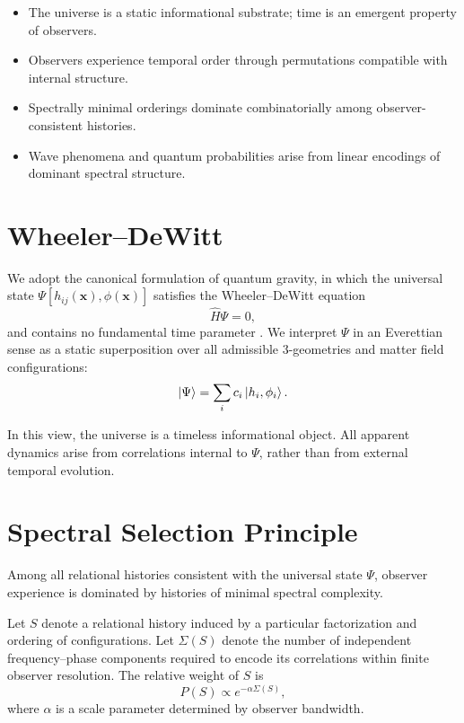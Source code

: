 \documentclass[11pt]{article}
\begin{document}
\begin{itemize}
\item The universe is a static informational substrate; time is an emergent property of observers.
\item Observers experience temporal order through permutations compatible with internal structure.
\item Spectrally minimal orderings dominate combinatorially among observer-consistent histories.
\item Wave phenomena and quantum probabilities arise from linear encodings of dominant spectral structure.
\end{itemize}

\section{Wheeler--DeWitt}

We adopt the canonical formulation of quantum gravity, in which the universal state
\(
\Psi[h_{ij}(\mathbf{x}),\phi(\mathbf{x})]
\)
satisfies the Wheeler--DeWitt equation
\begin{equation}
\hat{H}\Psi = 0,
\end{equation}
and contains no fundamental time parameter \cite{dewitt1967}.
We interpret \( \Psi \) in an Everettian sense as a static superposition over all admissible
3-geometries and matter field configurations:
\begin{equation}
\ket{\Psi} = \sum_i c_i \ket{h_i,\phi_i}.
\end{equation}

In this view, the universe is a timeless informational object.
All apparent dynamics arise from correlations internal to \( \Psi \),
rather than from external temporal evolution.

\section{Spectral Selection Principle}

Among all relational histories consistent with the universal state \( \Psi \),
observer experience is dominated by histories of minimal spectral complexity.

Let \( S \) denote a relational history induced by a particular factorization
and ordering of configurations.
Let \( \Sigma(S) \) denote the number of independent frequency--phase components
required to encode its correlations within finite observer resolution.
The relative weight of \( S \) is
\begin{equation}
P(S) \propto e^{-\alpha \Sigma(S)},
\end{equation}
where \( \alpha \) is a scale parameter determined by observer bandwidth.
\end{document}
